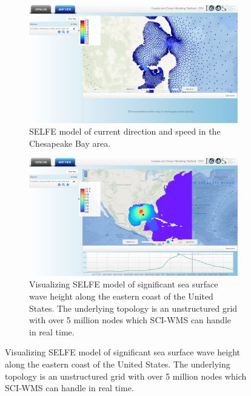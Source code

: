 \newif\ifpltsub

\pltsubtrue%

\ifpltsub
\begin{figure}[ht!]
  \begin{subfigure}[t]{0.49\textwidth}
    \centering
    \includegraphics[width=\columnwidth]{../figs/vims_selfe_ubaratropic_vbaratropic_chesapeake_bay_crop_27_175_2825_1600}
    \caption{SELFE model of current
      direction and speed in the Chesapeake Bay area.}
    \label{fig:vims_selfe_chesapeake}
  \end{subfigure}
  \begin{subfigure}[t]{0.49\textwidth}
    \centering
    \includegraphics[width=\columnwidth]{../figs/inundation_tropical_VIMS_SELFE_hurricane_rita_2d_final_run_with_waves_sea_surface_wave_significant_height_crop_27_175_2825_1600}
    \caption{Visualizing SELFE model of significant sea surface wave height along the eastern coast of the United States. The underlying topology is an unstructured grid with over 5 million nodes which SCI-WMS can handle in real time.}
    \label{fig:vims_selfe_ssh}
  \end{subfigure}
\end{figure}
